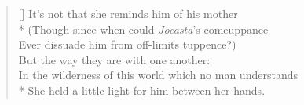 \settowidth{\versewidth}{In the wilderness of this world which no man understands}
\begin{verse}[\versewidth]
\vin It's not that she reminds him of his mother\\*
\vin \vin (Though since when could \textit{Jocasta}'s comeuppance\\
\vin \vin Ever dissuade him from off-limits tuppence?)\\
\vin But the way they are with one another:\\
In the wilderness of this world which no man understands\\*
She held a little light for him between her hands.
\end{verse}
